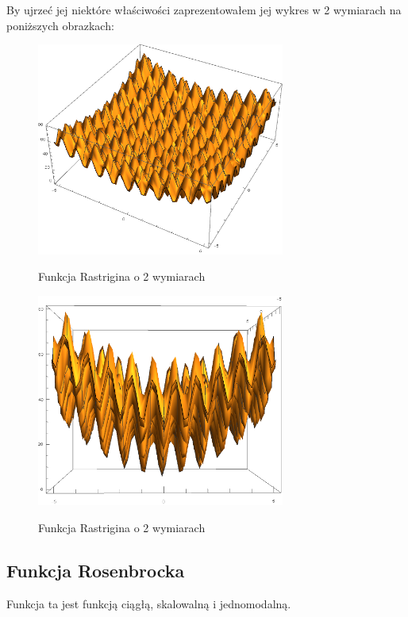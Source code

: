 \documentclass[twoside]{projektInzynierskiMS1}
\newcommand{\si}{ś}
\begin{document}
By ujrzeć jej niektóre wła\si ciwo\si ci zaprezentowałem jej wykres w 2 wymiarach na poniższych obrazkach:\\
\begin{figure}[H]
	\begin{center}
		\includegraphics[height=7cm]{rastriginFunction1.png}\\
	\end{center}
	\caption{Funkcja Rastrigina o 2 wymiarach}
\end{figure}
\begin{figure}[H]
	\begin{center}
		\includegraphics[height=7cm]{rastriginFunction2.png}\\
	\end{center}
	\caption{Funkcja Rastrigina o 2 wymiarach}
\end{figure}



	\subsection{Funkcja Rosenbrocka}
Funkcja ta jest funkcją ciągłą, skalowalną i jednomodalną.
\end{document}
